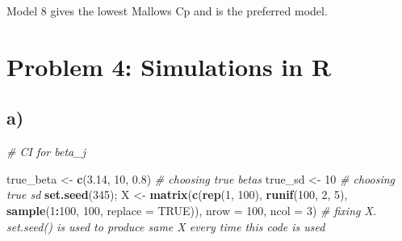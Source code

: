 \documentclass[]{article}
\newenvironment{Shaded}{\begin{snugshade}}{\end{snugshade}}
\newcommand{\KeywordTok}[1]{\textcolor[rgb]{0.13,0.29,0.53}{\textbf{#1}}}
\newcommand{\DataTypeTok}[1]{\textcolor[rgb]{0.13,0.29,0.53}{#1}}
\newcommand{\DecValTok}[1]{\textcolor[rgb]{0.00,0.00,0.81}{#1}}
\newcommand{\FloatTok}[1]{\textcolor[rgb]{0.00,0.00,0.81}{#1}}
\newcommand{\StringTok}[1]{\textcolor[rgb]{0.31,0.60,0.02}{#1}}
\newcommand{\CommentTok}[1]{\textcolor[rgb]{0.56,0.35,0.01}{\textit{#1}}}
\newcommand{\OtherTok}[1]{\textcolor[rgb]{0.56,0.35,0.01}{#1}}
\newcommand{\OperatorTok}[1]{\textcolor[rgb]{0.81,0.36,0.00}{\textbf{#1}}}
\newcommand{\NormalTok}[1]{#1}
\begin{document}
Model 8 gives the lowest Mallows Cp and is the preferred model.

\section{Problem 4: Simulations in R}\label{problem-4-simulations-in-r}

\subsection{a)}\label{a-2}

\begin{Shaded}
\begin{Highlighting}[]
\CommentTok{# CI for beta_j}

\NormalTok{true_beta <-}\StringTok{ }\KeywordTok{c}\NormalTok{(}\FloatTok{3.14}\NormalTok{, }\DecValTok{10}\NormalTok{, }\FloatTok{0.8}\NormalTok{) }\CommentTok{# choosing true betas}
\NormalTok{true_sd <-}\StringTok{ }\DecValTok{10} \CommentTok{# choosing true sd}
\KeywordTok{set.seed}\NormalTok{(}\DecValTok{345}\NormalTok{); X <-}\StringTok{ }\KeywordTok{matrix}\NormalTok{(}\KeywordTok{c}\NormalTok{(}\KeywordTok{rep}\NormalTok{(}\DecValTok{1}\NormalTok{, }\DecValTok{100}\NormalTok{), }\KeywordTok{runif}\NormalTok{(}\DecValTok{100}\NormalTok{, }\DecValTok{2}\NormalTok{, }\DecValTok{5}\NormalTok{), }\KeywordTok{sample}\NormalTok{(}\DecValTok{1}\OperatorTok{:}\DecValTok{100}\NormalTok{, }\DecValTok{100}\NormalTok{, }\DataTypeTok{replace =} \OtherTok{TRUE}\NormalTok{)), }
            \DataTypeTok{nrow =} \DecValTok{100}\NormalTok{, }\DataTypeTok{ncol =} \DecValTok{3}\NormalTok{) }\CommentTok{# fixing X. set.seed() is used to produce same X every time this code is used}


\end{Highlighting}
\end{Shaded}
\end{document}
